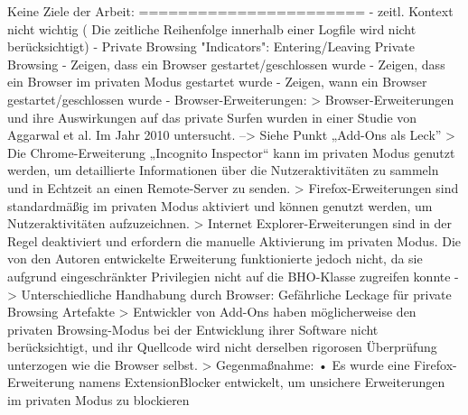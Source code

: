 Keine Ziele der Arbeit:
=======================
-	zeitl. Kontext nicht wichtig ( Die zeitliche Reihenfolge innerhalb einer Logfile wird nicht berücksichtigt)
- 	Private Browsing "Indicators": Entering/Leaving Private Browsing \cite{Ohana.2013}
-	Zeigen, dass ein Browser gestartet/geschlossen wurde
-	Zeigen, dass ein Browser im privaten Modus gestartet wurde
-	Zeigen, wann ein Browser gestartet/geschlossen wurde
- Browser-Erweiterungen: \cite{Satvat.2014}
	> Browser-Erweiterungen und ihre Auswirkungen auf das private Surfen wurden in einer Studie von Aggarwal et al. Im Jahr 2010 untersucht. --> Siehe Punkt „Add-Ons als Leck”
	> Die Chrome-Erweiterung „Incognito Inspector“ kann im privaten Modus genutzt werden, um detaillierte Informationen über die Nutzeraktivitäten zu sammeln und in Echtzeit an einen Remote-Server zu senden.
	> Firefox-Erweiterungen sind standardmäßig im privaten Modus aktiviert und können genutzt werden, um Nutzeraktivitäten aufzuzeichnen.
	> Internet Explorer-Erweiterungen sind in der Regel deaktiviert und erfordern die manuelle Aktivierung im privaten Modus. Die von den Autoren entwickelte Erweiterung funktionierte jedoch nicht, da sie aufgrund eingeschränkter Privilegien nicht auf die BHO-Klasse zugreifen konnte
- \cite{Aggarwal.2010}
	> Unterschiedliche Handhabung durch Browser: Gefährliche Leckage für private Browsing Artefakte
	> Entwickler von Add-Ons haben möglicherweise den privaten Browsing-Modus bei der Entwicklung ihrer Software nicht berücksichtigt, und ihr Quellcode wird nicht derselben rigorosen Überprüfung unterzogen wie die Browser selbst.
	> Gegenmaßnahme: \cite{Aggarwal.2010} 
		•	Es wurde eine Firefox-Erweiterung namens ExtensionBlocker entwickelt, um unsichere Erweiterungen im privaten Modus zu blockieren



